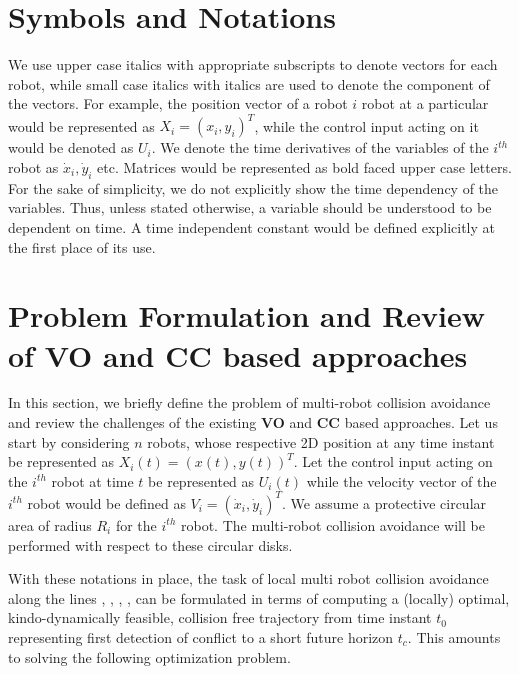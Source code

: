 \documentclass[letterpaper, 10 pt, conference]{IEEEtran}  %
\begin{document}
\section{Symbols and Notations}
We use upper case italics with appropriate subscripts to denote vectors for each robot, while small case italics with italics are used to denote the component of the vectors. For example, the position vector of a robot $i$ robot at a particular  would be represented as $X_i=(x_i, y_i)^T$, while the control input acting on it would be denoted as $U_i$. We denote the time derivatives of the variables of the $i^{th}$ robot as $\dot{x}_i, \dot{y}_i $ etc. Matrices would be represented as bold faced upper case letters. For the sake of simplicity, we do not explicitly show the time dependency of the variables. Thus, unless stated otherwise, a variable should be understood to be dependent on time. A time independent constant would be defined explicitly at the first place of its use.


  


\section{Problem Formulation and Review of \textbf{VO} and \textbf{CC} based approaches}

In this section, we briefly define the problem of multi-robot collision avoidance and review the challenges of the existing \textbf{VO} and \textbf{CC} based approaches. Let us start by considering $n$ robots, whose respective 2D position at any time instant be represented as $X_i(t) = (x(t), y(t))^T$. Let the control input acting on the $i^{th}$ robot at time $t$ be represented as $U_i(t)$ while the velocity vector of the $i^{th}$ robot would be defined as $V_i = (\dot{x}_i, \dot{y}_i)^T$. We assume a protective circular area of radius $R_i$ for the $i^{th}$ robot. The multi-robot collision avoidance will be performed with respect to these circular disks. 

With these notations in place,  the task of local multi robot collision avoidance along the lines \cite{rvo}, \cite{avo} \cite{orca}, \cite{alonzo1}, \cite{joint_util}, \cite{motion_cont} can be formulated  in terms of computing a (locally) optimal, kindo-dynamically feasible, collision free trajectory from time instant $t_0$ representing first detection of conflict to a short future horizon $t_c$. This amounts to solving the following optimization problem.
\end{document}
